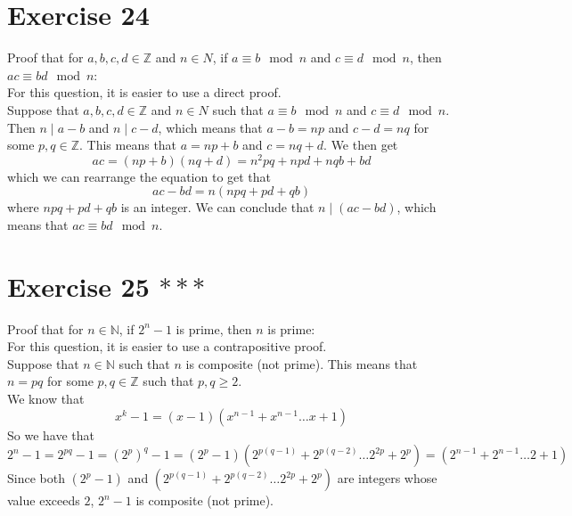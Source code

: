 \documentclass[12pt]{article}
\newcommand{\N}{\mathbb{N}}
\newcommand{\Z}{\mathbb{Z}}
\begin{document}
    \section*{Exercise 24}
    Proof that for $a, b, c, d \in \Z$ and $n \in N$,
    if $a \equiv b \mod n$ and $c \equiv d \mod n$,
    then $ac \equiv bd \mod n$: \\
    For this question, it is easier to use a direct proof. \\
    Suppose that $a, b, c, d \in \Z$ and $n \in N$
    such that $a \equiv b \mod n$ and $c \equiv d \mod n$.
    Then $n \mid a - b$ and $n \mid c - d$,
    which means that $a-b = np$ and $c -d = nq$
    for some $p, q \in \Z$.
    This means that $a = np + b$ and $c = nq + d$.
    We then get
    \[ ac = (np+b)(nq+d) = n^2pq + npd + nqb + bd \]
    which we can rearrange the equation to get that
    \[ ac - bd = n(npq + pd + qb) \]
    where $npq + pd + qb$ is an integer.
    We can conclude that $n \mid (ac - bd)$,
    which means that $ac \equiv bd \mod n$. \\

    \section*{Exercise 25 $***$}
    Proof that for $n \in \N$,
    if $2^n - 1$ is prime,
    then $n$ is prime: \\
    For this question, it is easier to use a contrapositive proof. \\
    Suppose that $n \in \N$
    such that $n$ is composite (not prime).
    This means that $n = pq$ for some $p, q \in \Z$
    such that $p, q \geqslant 2$. \\
    We know that
    \[ x^k - 1 = (x-1)(x^{n-1} + x^{n-1} \dots x + 1) \]
    So we have that
    \[ 2^n - 1 = 2^{pq} - 1 = (2^p)^q - 1
    = (2^p - 1)(2^{p(q-1)} + 2^{p(q-2)} \dots 2^{2p} + 2^p) = 
    (2^{n-1} + 2^{n-1} \dots 2 + 1) \]
    Since both $(2^p - 1)$
    and $(2^{p(q-1)} + 2^{p(q-2)} \dots 2^{2p} + 2^p)$
    are integers whose value exceeds $2$,
    $2^n - 1$ is composite (not prime). \\
\end{document}
